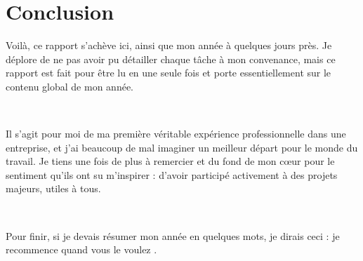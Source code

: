 \chapter*{Conclusion}
Voilà, ce rapport s'achève ici, ainsi que mon année à quelques jours près. Je déplore de ne pas avoir pu détailler chaque tâche à mon convenance, mais ce rapport est fait pour être lu en une seule fois et porte essentiellement sur le contenu global de mon année.

~

Il s'agit pour moi de ma première véritable expérience professionnelle dans une entreprise, et j'ai beaucoup de mal imaginer un meilleur départ pour le monde du travail. Je tiens une fois de plus à remercier \solulog{} et \fidit{} du fond de mon cœur pour le sentiment qu'ils ont su m'inspirer : d'avoir participé activement à des projets majeurs, utiles à tous.

~

Pour finir, si je devais résumer mon année en quelques mots, je dirais ceci : \og je recommence quand vous le voulez \fg.

